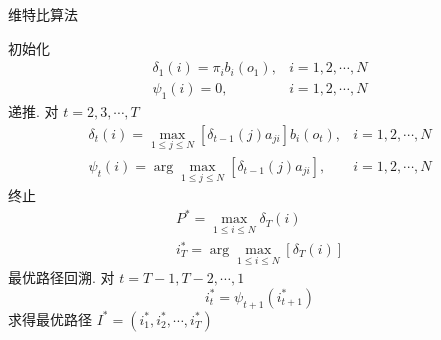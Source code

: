 \begin{algorithm}
\caption{维特比算法}


    初始化
$$
\begin{array}{cc}
\delta_{1}(i)=\pi_{i} b_{i}\left(o_{1}\right), & i=1,2, \cdots, N \\
\psi_{1}(i)=0, & i=1,2, \cdots, N
\end{array}
$$\;
递推. 对 $ t=2,3, \cdots, T $
$$
\begin{array}{ll}
\delta_{t}(i)=\max _{1 \leqslant j \leqslant N}\left[\delta_{t-1}(j) a_{j i}\right] b_{i}\left(o_{t}\right), & i=1,2, \cdots, N \\
\psi_{t}(i)=\arg \max _{1 \leqslant j \leqslant N}\left[\delta_{t-1}(j) a_{j i}\right], & i=1,2, \cdots, N
\end{array}
$$\;
终止
$$
\begin{array}{c}
P^{*}=\max _{1 \leqslant i \leqslant N} \delta_{T}(i) \\
i_{T}^{*}=\arg \max _{1 \leqslant i \leqslant N}\left[\delta_{T}(i)\right]
\end{array}
$$\;
最优路径回溯. 对 $ t=T-1, T-2, \cdots, 1 $
$$
i_{t}^{*}=\psi_{t+1}\left(i_{t+1}^{*}\right)
$$
求得最优路径 $ I^{*}=\left(i_{1}^{*}, i_{2}^{*}, \cdots, i_{T}^{*}\right) $
\;

\end{algorithm}{}